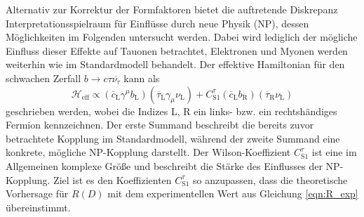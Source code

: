 Alternativ zur Korrektur der Formfaktoren bietet die auftretende Diskrepanz Interpretationsspielraum für Einflüsse durch neue Physik (NP), dessen Möglichkeiten im Folgenden untersucht werden.
Dabei wird lediglich der mögliche Einfluss dieser Effekte auf Tauonen betrachtet, Elektronen und Myonen werden weiterhin wie im Standardmodell behandelt.
Der effektive Hamiltonian für den schwachen Zerfall $b \to c \tau \overline{\nu_\tau}$ kann als
\begin{equation}
  \mathcal{H}_\text{eff} \propto (\overline{c}_\text{L} \gamma^\mu b_\text{L})(\overline{\tau}_\text{L} \gamma_\mu \nu_\text{L} ) +  C_{\text{S}1}^\tau (\overline {c}_\text{L} b_\text{R}) (\overline{\tau}_\text{R} \nu_\text{L})
\end{equation}
geschrieben werden, wobei die Indizes $\text{L}$, $\text{R}$ ein links- bzw. ein rechtshändiges Fermion kennzeichnen.
Der erste Summand beschreibt die bereits zuvor betrachtete Kopplung  im Standardmodell, während der zweite Summand eine konkrete, mögliche NP-Kopplung darstellt.
Der Wilson-Koeffizient $C_{\text{S}1}^\tau$ ist eine im Allgemeinen komplexe Größe und beschreibt die Stärke des Einflusses der NP-Kopplung.
Ziel ist es den Koeffizienten $C_{\text{S}1}^\tau$ so anzupassen, dass die theoretische Vorhersage für $R(D)$ mit dem experimentellen Wert aus Gleichung \eqref{eqn:R_exp} übereinstimmt.

